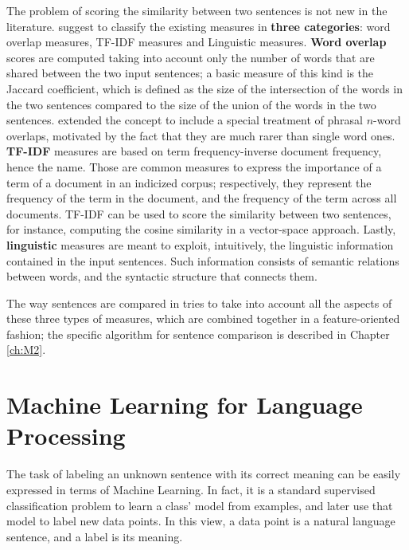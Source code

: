 The problem of scoring the similarity between two sentences is not new in the literature. \cite{Achananuparp:2008:ESS:1430555.1430594} suggest to classify the existing measures in \textbf{three categories}: word overlap measures, TF-IDF measures and Linguistic measures. \textbf{Word overlap} scores are computed taking into account only the number of words that are shared between the two input sentences; a basic measure of this kind is the Jaccard coefficient, which is defined as the size of the intersection of the words in the two sentences compared to the size of the union of the words in the two sentences. \cite{Banerjee03extendedgloss} extended the concept to include a special treatment of phrasal $n$-word overlaps, motivated by the fact that they are much rarer than single word ones. \textbf{TF-IDF} measures are based on term frequency-inverse document frequency, hence the name. Those are common measures to express the importance of a term of a document in an  indicized corpus; respectively, they represent the frequency of the term in the document, and the frequency of the term across all documents. TF-IDF can be used to score the similarity between two sentences, for instance, computing the cosine similarity in a vector-space approach. Lastly, \textbf{linguistic} measures are meant to exploit, intuitively, the linguistic information contained in the input sentences. Such information consists of semantic relations between words, and the syntactic structure that connects them. %

The way sentences are compared in \pname tries to take into account all the aspects of these three types of measures, which are combined together in a feature-oriented fashion; the specific algorithm for sentence comparison is described in Chapter \ref{ch:M2}.


\section{Machine Learning for Language Processing}
The task of labeling an unknown sentence with its correct meaning can be easily expressed in terms of Machine Learning. In fact, it is a standard supervised classification problem to learn a class' model from examples, and later use that model to label new data points. In this view, a data point is a natural language sentence, and a label is its meaning. 

